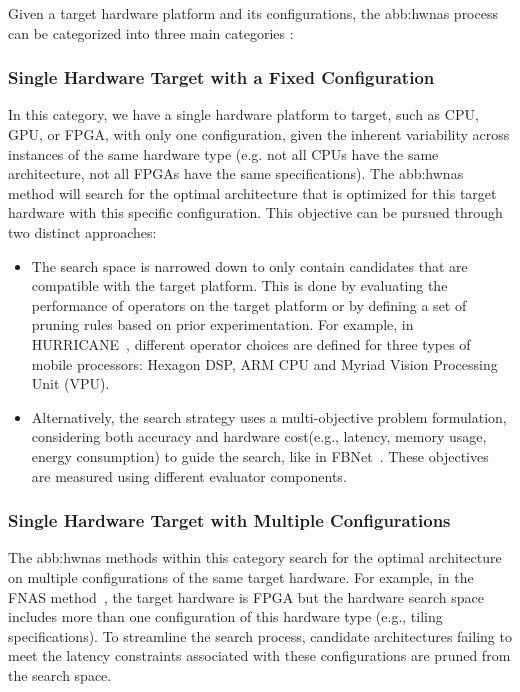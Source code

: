         Given a target hardware platform and its configurations, the \gls{abb:hwnas} process can be categorized into three main categories : 
        
        \subsubsection{Single Hardware Target with a Fixed Configuration}
            In this category, we have a single hardware platform to target, such as CPU,  GPU, or FPGA,  with only one configuration, given the inherent variability across instances of the same hardware type (e.g. not all CPUs have the same architecture, not all FPGAs have the same specifications). The \gls{abb:hwnas} method will search for the optimal architecture that is optimized for this target hardware with this specific configuration. This objective can be pursued through two distinct approaches:

            \begin{itemize}
                \item The search space is narrowed down to only contain candidates that are compatible with the target platform. This is done by evaluating the performance of operators on the target platform or by defining a set of pruning rules based on prior experimentation. For example, in HURRICANE~\cite{hurricane},  different operator choices are defined for three types of mobile processors: Hexagon DSP, ARM CPU and Myriad Vision Processing Unit (VPU).
                
                \item Alternatively, the search strategy uses a multi-objective problem formulation, considering both accuracy and hardware cost(e.g., latency, memory usage, energy consumption) to guide the search, like in FBNet~\cite{fbnet}. These objectives are measured using different evaluator components.
            \end{itemize}
               

        \subsubsection{Single Hardware Target with Multiple Configurations}
            The \gls{abb:hwnas} methods within this category search for the optimal architecture on multiple configurations of the same target hardware. For example, in the FNAS method~\cite{fnas}, the target hardware is FPGA but the hardware search space includes more than one configuration of this hardware type (e.g., tiling specifications). To streamline the search process, candidate architectures failing to meet the latency constraints associated with these configurations are pruned from the search space.

